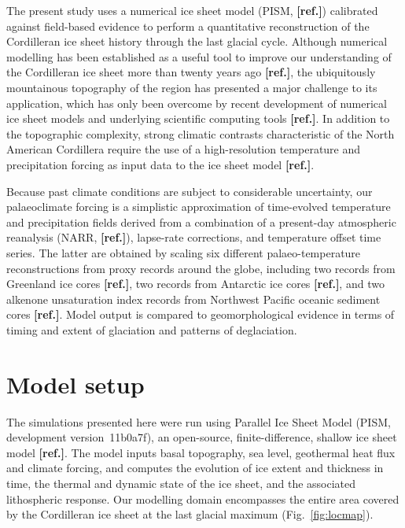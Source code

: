 \documentclass[tc, manuscript]{copernicus}
\newcommand{\aref}[0]{\textbf{[ref.]}}
\begin{document}
The present study uses a numerical ice sheet model (PISM, \aref) calibrated against
field-based evidence to perform a quantitative reconstruction of the
Cordilleran ice sheet history through the last glacial cycle. Although
numerical modelling has been established as a useful tool to improve our
understanding
of the Cordilleran ice sheet more than twenty years ago \aref, the ubiquitously
mountainous topography of the region has presented a major challenge to its
application, which has only been overcome by recent development of numerical ice
sheet models and underlying scientific computing tools \aref. In addition to the topographic
complexity, strong climatic contrasts characteristic of the North American
Cordillera require the use of a high-resolution temperature and precipitation
forcing as input data to the ice sheet model \aref.

Because past climate conditions are subject to considerable uncertainty, our
palaeoclimate forcing is a simplistic approximation of time-evolved temperature
and precipitation fields derived from a combination of a present-day
atmospheric reanalysis (NARR, \aref), lapse-rate corrections,
and temperature offset time series. The latter are
obtained by scaling six different palaeo-temperature reconstructions from
proxy records around the globe, including two  records from
Greenland ice cores \aref, two  records from Antarctic ice cores \aref,
and two alkenone unsaturation index records from Northwest Pacific oceanic
sediment cores \aref. Model output is compared to geomorphological evidence in terms
of timing and extent of glaciation and patterns of deglaciation.


\section{Model setup}
\label{sec:model}

The simulations presented here were run using Parallel Ice Sheet Model (PISM,
development version~11b0a7f), an open-source, finite-difference, shallow ice
sheet model \aref. The model inputs basal topography, sea level, geothermal
heat flux and climate forcing, and computes the evolution of ice extent
and thickness in time, the thermal and dynamic state of the ice sheet, and
the associated lithospheric response. Our modelling domain encompasses the
entire area covered by the Cordilleran ice sheet at the last glacial maximum
(Fig.~\ref{fig:locmap}).
\end{document}
